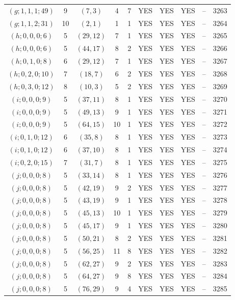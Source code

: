 \begin{longtable}{|c|c|c|c|c|c|c|c|c|c|}
$(g; 1, 1, 1; 49)$ & 9 & $(7, 3)$ & 4 & 7 & YES & YES & YES & -- & 3263\\
$(g; 1, 1, 2; 31)$ & 10 & $(2, 1)$ & 1 & 1 & YES & YES & YES & -- & 3264\\
$(h; 0, 0, 0; 6)$ & 5 & $(29, 12)$ & 7 & 1 & YES & YES & YES & -- & 3265\\
$(h; 0, 0, 0; 6)$ & 5 & $(44, 17)$ & 8 & 2 & YES & YES & YES & -- & 3266\\
$(h; 0, 1, 0; 8)$ & 6 & $(29, 12)$ & 7 & 1 & YES & YES & YES & -- & 3267\\
$(h; 0, 2, 0; 10)$ & 7 & $(18, 7)$ & 6 & 2 & YES & YES & YES & -- & 3268\\
$(h; 0, 3, 0; 12)$ & 8 & $(10, 3)$ & 5 & 2 & YES & YES & YES & -- & 3269\\
$(i; 0, 0, 0; 9)$ & 5 & $(37, 11)$ & 8 & 1 & YES & YES & YES & -- & 3270\\
$(i; 0, 0, 0; 9)$ & 5 & $(49, 13)$ & 9 & 1 & YES & YES & YES & -- & 3271\\
$(i; 0, 0, 0; 9)$ & 5 & $(64, 15)$ & 10 & 1 & YES & YES & YES & -- & 3272\\
$(i; 0, 1, 0; 12)$ & 6 & $(35, 8)$ & 8 & 1 & YES & YES & YES & -- & 3273\\
$(i; 0, 1, 0; 12)$ & 6 & $(37, 10)$ & 8 & 1 & YES & YES & YES & -- & 3274\\
$(i; 0, 2, 0; 15)$ & 7 & $(31, 7)$ & 8 & 1 & YES & YES & YES & -- & 3275\\
$(j; 0, 0, 0; 8)$ & 5 & $(33, 14)$ & 8 & 1 & YES & YES & YES & -- & 3276\\
$(j; 0, 0, 0; 8)$ & 5 & $(42, 19)$ & 9 & 2 & YES & YES & YES & -- & 3277\\
$(j; 0, 0, 0; 8)$ & 5 & $(43, 19)$ & 9 & 1 & YES & YES & YES & -- & 3278\\
$(j; 0, 0, 0; 8)$ & 5 & $(45, 13)$ & 10 & 1 & YES & YES & YES & -- & 3279\\
$(j; 0, 0, 0; 8)$ & 5 & $(45, 17)$ & 9 & 1 & YES & YES & YES & -- & 3280\\
$(j; 0, 0, 0; 8)$ & 5 & $(50, 21)$ & 8 & 2 & YES & YES & YES & -- & 3281\\
$(j; 0, 0, 0; 8)$ & 5 & $(56, 25)$ & 11 & 8 & YES & YES & YES & -- & 3282\\
$(j; 0, 0, 0; 8)$ & 5 & $(62, 27)$ & 9 & 2 & YES & YES & YES & -- & 3283\\
$(j; 0, 0, 0; 8)$ & 5 & $(64, 27)$ & 9 & 8 & YES & YES & YES & -- & 3284\\
$(j; 0, 0, 0; 8)$ & 5 & $(76, 29)$ & 9 & 4 & YES & YES & YES & -- & 3285\\

\end{longtable}
